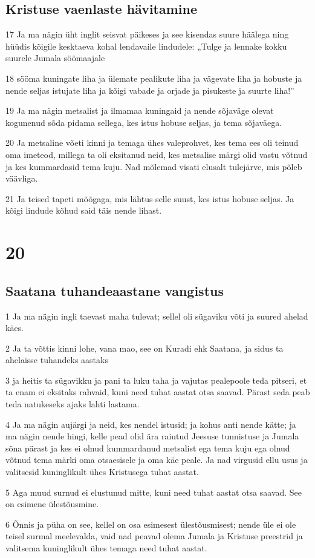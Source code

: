 \section*{Kristuse vaenlaste hävitamine}

\par 17 Ja ma nägin üht inglit seisvat päikeses ja see kisendas suure häälega ning hüüdis kõigile kesktaeva kohal lendavaile lindudele: „Tulge ja lennake kokku suurele Jumala söömaajale
\par 18 sööma kuningate liha ja ülemate pealikute liha ja vägevate liha ja hobuste ja nende seljas istujate liha ja kõigi vabade ja orjade ja pisukeste ja suurte liha!”
\par 19 Ja ma nägin metsalist ja ilmamaa kuningaid ja nende sõjaväge olevat kogunenud sõda pidama sellega, kes istus hobuse seljas, ja tema sõjaväega.
\par 20 Ja metsaline võeti kinni ja temaga ühes valeprohvet, kes tema ees oli teinud oma imeteod, millega ta oli eksitanud neid, kes metsalise märgi olid vastu võtnud ja kes kummardasid tema kuju. Nad mõlemad visati elusalt tulejärve, mis põleb väävliga.
\par 21 Ja teised tapeti mõõgaga, mis lähtus selle suust, kes istus hobuse seljas. Ja kõigi lindude kõhud said täis nende lihast.


\chapter{20}

\section*{Saatana tuhandeaastane vangistus}

\par 1 Ja ma nägin ingli taevast maha tulevat; sellel oli sügaviku võti ja suured ahelad käes.
\par 2 Ja ta võttis kinni lohe, vana mao, see on Kuradi ehk Saatana, ja sidus ta ahelaisse tuhandeks aastaks
\par 3 ja heitis ta sügavikku ja pani ta luku taha ja vajutas pealepoole teda pitseri, et ta enam ei eksitaks rahvaid, kuni need tuhat aastat otsa saavad. Pärast seda peab teda natukeseks ajaks lahti lastama.
\par 4 Ja ma nägin aujärgi ja neid, kes nendel istusid; ja kohus anti nende kätte; ja ma nägin nende hingi, kelle pead olid ära raiutud Jeesuse tunnistuse ja Jumala sõna pärast ja kes ei olnud kummardanud metsalist ega tema kuju ega olnud võtnud tema märki oma otsaesisele ja oma käe peale. Ja nad virgusid ellu usus ja valitsesid kuninglikult ühes Kristusega tuhat aastat.
\par 5 Aga muud surnud ei elustunud mitte, kuni need tuhat aastat otsa saavad. See on esimene ülestõusmine.
\par 6 Õnnis ja püha on see, kellel on osa esimesest ülestõusmisest; nende üle ei ole teisel surmal meelevalda, vaid nad peavad olema Jumala ja Kristuse preestrid ja valitsema kuninglikult ühes temaga need tuhat aastat.

